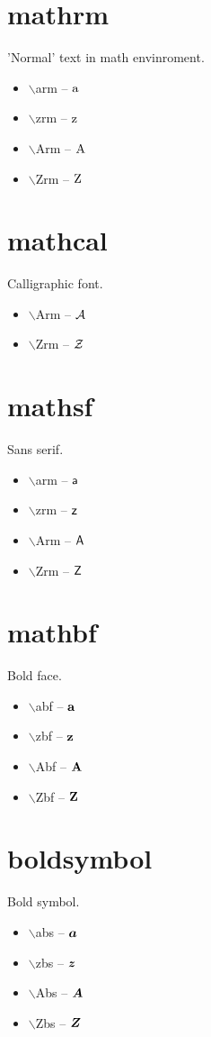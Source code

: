 \documentclass[twocolumn, a4paper]{article}
\begin{document}
	\section{mathrm}
	'Normal' text in math envinroment.
	\begin{itemize}
		\item $\backslash$arm -- $\mathrm{a}$ 
		\item $\backslash$zrm -- $\mathrm{z}$ 
		\item $\backslash$Arm -- $\mathrm{A}$
		\item $\backslash$Zrm -- $\mathrm{Z}$  
	\end{itemize}
	
	\section{mathcal}
	Calligraphic font.
	\begin{itemize} 
		\item $\backslash$Arm -- $\mathcal{A}$
		\item $\backslash$Zrm -- $\mathcal{Z}$  
	\end{itemize}

	\section{mathsf}
	Sans serif.
	\begin{itemize} 
		\item $\backslash$arm -- $\mathsf{a}$
		\item $\backslash$zrm -- $\mathsf{z}$  
		\item $\backslash$Arm -- $\mathsf{A}$
		\item $\backslash$Zrm -- $\mathsf{Z}$  
	\end{itemize}

	\section{mathbf}
	Bold face.
	\begin{itemize} 
		\item $\backslash$abf -- $\mathbf{a}$
		\item $\backslash$zbf -- $\mathbf{z}$  
		\item $\backslash$Abf -- $\mathbf{A}$
		\item $\backslash$Zbf -- $\mathbf{Z}$  
	\end{itemize}

	\section{boldsymbol}
	Bold symbol.
	\begin{itemize} 
		\item $\backslash$abs -- $\boldsymbol{a}$
		\item $\backslash$zbs -- $\boldsymbol{z}$  
		\item $\backslash$Abs -- $\boldsymbol{A}$
		\item $\backslash$Zbs -- $\boldsymbol{Z}$  
	\end{itemize}
\end{document}
